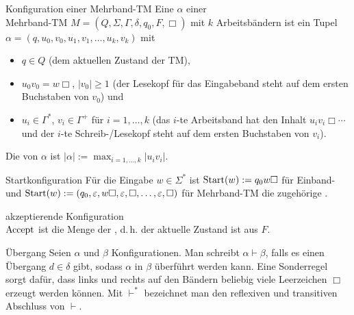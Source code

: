 \begin{Def}{Konfiguration einer Mehrband-TM}
    Eine  $\alpha$ einer\\
    Mehrband-TM
    $M = (Q, \Sigma, \Gamma, \delta, q_0, F, \Box)$ mit $k$ Arbeitsbändern ist ein Tupel\\
    $\alpha = (q, u_0, v_0, u_1, v_1, \dotsc, u_k, v_k)$ mit
    \begin{itemize}
        \item
        $q \in Q$ (dem aktuellen Zustand der TM),
        
        \item
        $u_0 v_0 = w \Box$, $|v_0| \ge 1$ (der Lesekopf für das Eingabeband steht auf dem ersten
        Buchstaben von $v_0$) und
        
        \item
        $u_i \in \Gamma^\ast$, $v_i \in \Gamma^+$ für $i = 1, \dotsc, k$
        (das $i$-te Arbeitsband hat den Inhalt $u_i v_i \Box \dotsb$ und der $i$-te
        Schreib-/Lesekopf steht auf dem ersten Buchstaben von $v_i$).
    \end{itemize}
    Die  von $\alpha$ ist $|\alpha| := \max_{i = 1, \dotsc, k} |u_i v_i|$.
\end{Def}

\linie
\pagebreak

\begin{Def}{Startkonfiguration}
    Für die Eingabe $w \in \Sigma^\ast$ ist $\text{Start}(w) := q_0 w \Box$ für Einband- und
    $\text{Start}(w) := (q_0, \varepsilon, w\Box, \varepsilon, \Box, \dotsc, \varepsilon, \Box)$
    für Mehrband-TM die zugehörige .
\end{Def}

\begin{Def}{akzeptierende Konfiguration}\\
    $\text{Accept}$ ist die Menge der ,
    d.\,h. der aktuelle Zustand ist aus $F$.
\end{Def}

\begin{Def}{Übergang}
    Seien $\alpha$ und $\beta$ Konfigurationen.
    Man schreibt $\alpha \vdash \beta$, falls es einen Übergang $d \in \delta$ gibt,
    sodass $\alpha$ in $\beta$ überführt werden kann.
    Eine Sonderregel sorgt dafür, dass links und rechts auf den Bändern beliebig viele
    Leerzeichen $\Box$ erzeugt werden können.
    Mit $\vdash^\ast$ bezeichnet man den reflexiven und transitiven Abschluss von $\vdash$.
\end{Def}

